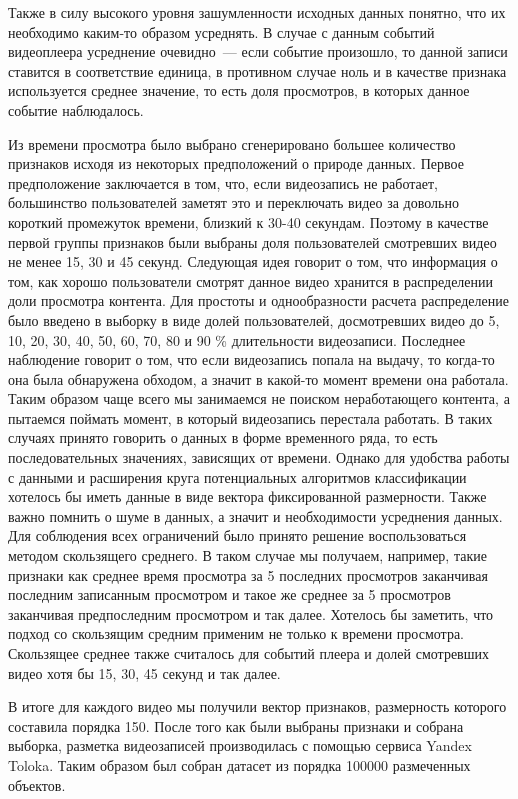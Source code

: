 Также в силу высокого уровня зашумленности исходных данных понятно, что их необходимо каким-то образом усреднять. В случае с данным событий видеоплеера усреднение очевидно~--- если событие произошло, то данной записи ставится в соответствие единица, в противном случае ноль и в качестве признака используется среднее значение, то есть доля просмотров, в которых данное событие наблюдалось.

Из времени просмотра было выбрано сгенерировано большее количество признаков исходя из некоторых предположений о природе данных. Первое предположение заключается в том, что, если видеозапись не работает, большинство пользователей заметят это и переключать видео за довольно короткий промежуток времени, близкий к 30-40 секундам. Поэтому в качестве первой группы признаков были выбраны доля пользователей смотревших видео не менее 15, 30 и 45 секунд. Следующая идея говорит о том, что информация о том, как хорошо пользователи смотрят данное видео хранится в распределении доли просмотра контента. Для простоты и однообразности расчета распределение было введено в выборку в виде долей пользователей, досмотревших видео до 5, 10, 20, 30, 40, 50, 60, 70, 80 и 90 \% длительности видеозаписи. Последнее наблюдение говорит о том, что если видеозапись попала на выдачу, то когда-то она была обнаружена обходом, а значит в какой-то момент времени она работала. Таким образом чаще всего мы занимаемся не поиском неработающего контента, а пытаемся поймать момент, в который видеозапись перестала работать. В таких случаях принято говорить о данных в форме временного ряда, то есть последовательных значениях, зависящих от времени. Однако для удобства работы с данными и расширения круга потенциальных алгоритмов классификации хотелось бы иметь данные в виде вектора фиксированной размерности. Также важно помнить о шуме в данных, а значит и необходимости усреднения данных. Для соблюдения всех ограничений было принято решение воспользоваться методом скользящего среднего. В таком случае мы получаем, например, такие признаки как среднее время просмотра за 5 последних просмотров заканчивая последним записанным просмотром и такое же среднее за 5 просмотров заканчивая предпоследним просмотром и так далее. Хотелось бы заметить, что подход со скользящим средним применим не только к времени просмотра. Скользящее среднее также считалось для событий плеера и долей смотревших видео хотя бы 15, 30, 45 секунд и так далее.

В итоге для каждого видео мы получили вектор признаков, размерность которого составила порядка 150. После того как были выбраны признаки и собрана выборка, разметка видеозаписей производилась с помощью сервиса Yandex Toloka. Таким образом был собран датасет из порядка 100000 размеченных объектов.